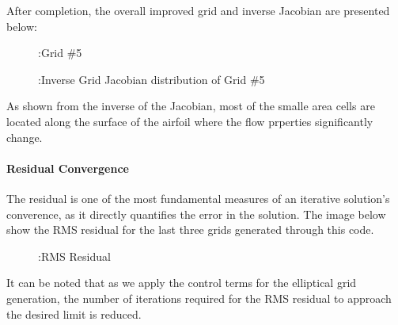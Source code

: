 \documentclass[letterpaper,10pt,english]{sphinxmanual}
\begin{document}
After completion, the overall improved grid and inverse Jacobian are presented below:
\begin{figure}[htbp]
\centering
\capstart

\noindent{}
\caption{:Grid \#5}\label{\detokenize{cases/grid_af:id10}}\end{figure}
\begin{figure}[htbp]
\centering
\capstart

\noindent{}
\caption{:Inverse Grid Jacobian distribution of Grid \#5}\label{\detokenize{cases/grid_af:id11}}\end{figure}

As shown from the inverse of the Jacobian, most of the smalle area cells are located along the surface of the airfoil where the flow prperties significantly change.


\paragraph{Residual Convergence}
\label{\detokenize{cases/grid_af:residual-convergence}}
The residual is one of the most fundamental measures of an iterative solution’s converence, as it directly quantifies the error in the solution. The image below show the RMS residual for the last three grids generated through this code.
\begin{figure}[htbp]
\centering
\capstart

\noindent{}
\caption{:RMS Residual}\label{\detokenize{cases/grid_af:id12}}\end{figure}

It can be noted that as we apply the control terms for the elliptical grid generation, the number of iterations required for the RMS residual to approach the desired limit is reduced.



\renewcommand{\indexname}{Index}
\printindex
\end{document}
